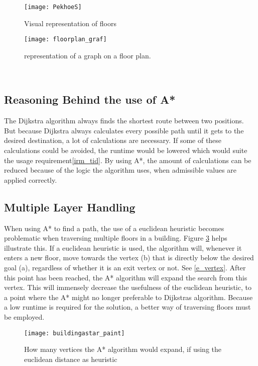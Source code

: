 \begin{figure}[ht!]
    \centering
    \texttt{[image: PekhoeS]}
    \caption{Visual representation of floors}
    \label{fig:PekhoeS}
  \end{figure}

\begin{figure}[ht!]
    \centering
    \texttt{[image: floorplan\_graf]}
    \caption{representation of a graph on a floor plan.}
    \label{fig:floorplan_graf}
  \end{figure}
\
\subsection{Reasoning Behind the use of A*}
The Dijkstra algorithm always finds the shortest route between two positions. But because Dijkstra always calculates every possible path until it gets to the desired destination, a lot of calculations are necessary. If some of these calculations could be avoided, the runtime would be lowered which would suite the usage requirement\cref{irm_tid}. By using A*, the amount of calculations can be reduced because of the logic the algorithm uses, when admissible values are applied correctly.

\subsection{Multiple Layer Handling} \label{multlayhan}

When using A* to find a path, the use of a euclidean heuristic becomes problematic when traversing multiple floors in a building. Figure \ref{fig:buildingAstar} helps illustrate this. If a euclidean heuristic is used, the algorithm will, whenever it enters a new floor, move towards the vertex (b) that is directly below the desired goal (a), regardless of whether it is an exit vertex or not. See \cref{e_vertex}. After this point has been reached, the A* algorithm will expand the search from this vertex. This will immensely decrease the usefulness of the euclidean heuristic, to a point where the A* might no longer preferable to Dijkstras algorithm. Because a low runtime is required for the solution, a better way of traversing floors must be employed.

\begin{figure}[ht!]
    \centering
    \texttt{[image: buildingastar\_paint]}
    \caption{How many vertices the A* algorithm would expand, if using the euclidean distance as heuristic}
    \label{fig:buildingAstar}
  \end{figure}


